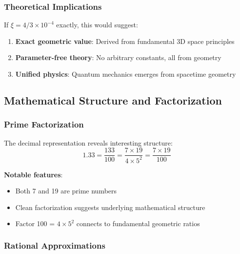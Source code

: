 \documentclass[12pt,a4paper]{article}
\newcommand{\xipar}{\ensuremath{\xi}}
\newcommand{\mytimes}{\ensuremath{\times}}
\begin{document}
	\subsubsection{Theoretical Implications}
	\label{subsubsec:theoretical_implications}
	
	If $\xipar = 4/3 \mytimes 10^{-4}$ exactly, this would suggest:
	\begin{enumerate}
		\item \textbf{Exact geometric value}: Derived from fundamental 3D space principles
		\item \textbf{Parameter-free theory}: No arbitrary constants, all from geometry
		\item \textbf{Unified physics}: Quantum mechanics emerges from spacetime geometry
	\end{enumerate}
	
	\subsection{Mathematical Structure and Factorization}
	\label{subsec:mathematical_structure}
	
	\subsubsection{Prime Factorization}
	\label{subsubsec:prime_factorization}
	
	The decimal representation reveals interesting structure:
	\begin{equation}
		1.33 = \frac{133}{100} = \frac{7 \mytimes 19}{4 \mytimes 5^2} = \frac{7 \mytimes 19}{100}
		\label{eq:factorization}
	\end{equation}
	
	\textbf{Notable features}:
	\begin{itemize}
		\item Both 7 and 19 are prime numbers
		\item Clean factorization suggests underlying mathematical structure
		\item Factor 100 = $4 \mytimes 5^2$ connects to fundamental geometric ratios
	\end{itemize}
	
	\subsubsection{Rational Approximations}
	\label{subsubsec:rational_approximations}
	
\end{document}
